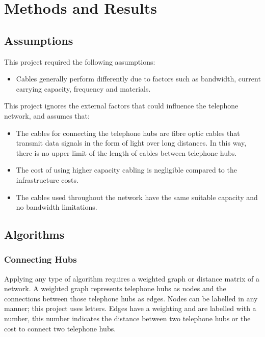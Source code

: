 \documentclass[twocolumn]{article}
\begin{document}


\section{Methods and Results}\label{Method}
\subsection{Assumptions}
This project required the following assumptions:
\begin{itemize}
  \item Cables generally perform differently due to factors such as bandwidth, current carrying capacity, frequency and materials. 
\end{itemize}


This project ignores the external factors that could influence the telephone network, and assumes that:
\begin{itemize}
  \item The cables for connecting the telephone hubs are fibre optic cables that transmit data signals in the form of light over long distances. In this way, there is no upper limit of the length of cables between telephone hubs.
  \item The cost of using higher capacity cabling is negligible compared to the infrastructure costs.
  \item The cables used throughout the network have the same suitable capacity and no bandwidth limitations.
\end{itemize}


\subsection{Algorithms}
\subsubsection{Connecting Hubs}
Applying any type of algorithm requires a weighted graph or distance matrix of a network. 
A weighted graph represents telephone hubs as nodes and the connections between those telephone hubs as edges. Nodes can be labelled in any manner; this project uses letters. Edges have a weighting and are labelled with a number, this number indicates the distance between two telephone hubs or the cost to connect two telephone hubs. 
\end{document}
